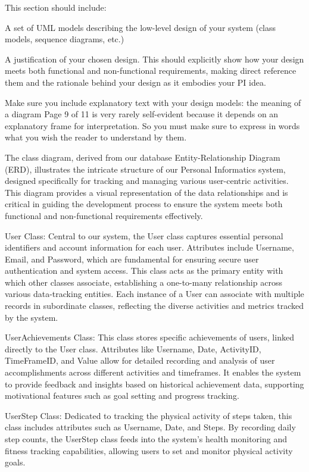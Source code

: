 \documentclass[12pt]{article}
\begin{document}
This section should include:

A set of UML models describing the low-level design of your system (class models,
sequence diagrams, etc.)

A justification of your chosen design. This should explicitly show how your design
meets both functional and non-functional requirements, making direct reference
them and the rationale behind your design as it embodies your PI idea.

Make sure you include explanatory text with your design models: the meaning of a diagram
Page 9 of 11
is very rarely self-evident because it depends on an explanatory frame for interpretation. So
you must make sure to express in words what you wish the reader to understand by them.


The class diagram, derived from our database Entity-Relationship Diagram (ERD), illustrates the intricate structure of our Personal Informatics system, designed specifically for tracking and managing various user-centric activities. This diagram provides a visual representation of the data relationships and is critical in guiding the development process to ensure the system meets both functional and non-functional requirements effectively.\par

User Class: Central to our system, the User class captures essential personal identifiers and account information for each user. Attributes include Username, Email, and Password, which are fundamental for ensuring secure user authentication and system access. This class acts as the primary entity with which other classes associate, establishing a one-to-many relationship across various data-tracking entities. Each instance of a User can associate with multiple records in subordinate classes, reflecting the diverse activities and metrics tracked by the system.\par

UserAchievements Class: This class stores specific achievements of users, linked directly to the User class. Attributes like Username, Date, ActivityID, TimeFrameID, and Value allow for detailed recording and analysis of user accomplishments across different activities and timeframes. It enables the system to provide feedback and insights based on historical achievement data, supporting motivational features such as goal setting and progress tracking.\par

UserStep Class: Dedicated to tracking the physical activity of steps taken, this class includes attributes such as Username, Date, and Steps. By recording daily step counts, the UserStep class feeds into the system’s health monitoring and fitness tracking capabilities, allowing users to set and monitor physical activity goals.\par
\end{document}
